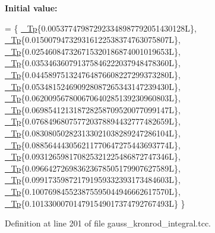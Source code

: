 {\bfseries Initial value\+:}
\begin{DoxyCode}
=
      \{
        \hyperlink{namespace____gnu__cxx_a3b19a9c800ca194374ef9172290f7d79}{\_Tp}\{0.005377479872923348987792051430128L\},
        \hyperlink{namespace____gnu__cxx_a3b19a9c800ca194374ef9172290f7d79}{\_Tp}\{0.015007947329316122538374763075807L\},
        \hyperlink{namespace____gnu__cxx_a3b19a9c800ca194374ef9172290f7d79}{\_Tp}\{0.025460847326715320186874001019653L\},
        \hyperlink{namespace____gnu__cxx_a3b19a9c800ca194374ef9172290f7d79}{\_Tp}\{0.035346360791375846222037948478360L\},
        \hyperlink{namespace____gnu__cxx_a3b19a9c800ca194374ef9172290f7d79}{\_Tp}\{0.044589751324764876608227299373280L\},
        \hyperlink{namespace____gnu__cxx_a3b19a9c800ca194374ef9172290f7d79}{\_Tp}\{0.053481524690928087265343147239430L\},
        \hyperlink{namespace____gnu__cxx_a3b19a9c800ca194374ef9172290f7d79}{\_Tp}\{0.062009567800670640285139230960803L\},
        \hyperlink{namespace____gnu__cxx_a3b19a9c800ca194374ef9172290f7d79}{\_Tp}\{0.069854121318728258709520077099147L\},
        \hyperlink{namespace____gnu__cxx_a3b19a9c800ca194374ef9172290f7d79}{\_Tp}\{0.076849680757720378894432777482659L\},
        \hyperlink{namespace____gnu__cxx_a3b19a9c800ca194374ef9172290f7d79}{\_Tp}\{0.083080502823133021038289247286104L\},
        \hyperlink{namespace____gnu__cxx_a3b19a9c800ca194374ef9172290f7d79}{\_Tp}\{0.088564443056211770647275443693774L\},
        \hyperlink{namespace____gnu__cxx_a3b19a9c800ca194374ef9172290f7d79}{\_Tp}\{0.093126598170825321225486872747346L\},
        \hyperlink{namespace____gnu__cxx_a3b19a9c800ca194374ef9172290f7d79}{\_Tp}\{0.096642726983623678505179907627589L\},
        \hyperlink{namespace____gnu__cxx_a3b19a9c800ca194374ef9172290f7d79}{\_Tp}\{0.099173598721791959332393173484603L\},
        \hyperlink{namespace____gnu__cxx_a3b19a9c800ca194374ef9172290f7d79}{\_Tp}\{0.100769845523875595044946662617570L\},
        \hyperlink{namespace____gnu__cxx_a3b19a9c800ca194374ef9172290f7d79}{\_Tp}\{0.101330007014791549017374792767493L\}
      \}
\end{DoxyCode}


Definition at line 201 of file gauss\+\_\+kronrod\+\_\+integral.\+tcc.

\mbox{\label{struct____gnu__cxx_1_1qk__integrator_3_01__Tp_00_01__FuncTp_00_01Kronrod__31_01_4_a69f1e7a6d85fcb57cd868436160040ac}} 
